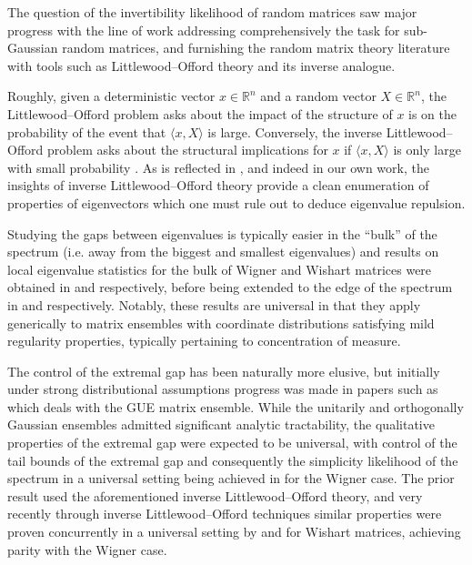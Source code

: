 \documentclass[11pt]{article}
\numberwithin{equation}{section}
\theoremstyle{remark}
\newcommand{\R}{\mathbb{R}}
\begin{document}
The question of the invertibility likelihood of random matrices saw major progress with the line of work \cite{rudelson2008littlewood, tao2009inverse, tao2009littlewood, rudelson2009smallest, vershynin2014invertibility} addressing comprehensively the task for sub-Gaussian random matrices, and furnishing the random matrix theory literature with tools such as Littlewood--Offord theory and its inverse analogue.

Roughly, given a deterministic vector $x \in \R^n$ and a random vector $X \in \R^n$, the Littlewood--Offord problem asks about the impact of the structure of $x$ is on the probability of the event that $\langle x, X \rangle$ is large. Conversely, the inverse Littlewood--Offord problem asks about the structural implications for $x$ if $\langle x, X \rangle$ is only large with small probability \cite{tao2009inverse}. As is reflected in \cite{nguyen2015randommatricestailbounds, han2025simplicity, christoffersen2025gaps}, and indeed in our own work, the insights of inverse Littlewood--Offord theory provide a clean enumeration of properties of eigenvectors which one must rule out to deduce eigenvalue repulsion.

Studying the gaps between eigenvalues is typically easier in the ``bulk'' of the spectrum (i.e. away from the biggest and smallest eigenvalues) and results on local eigenvalue statistics for the bulk of Wigner and Wishart matrices were obtained in \cite{tao2011random} and \cite{Tao_2012} respectively, before being extended to the edge of the spectrum in \cite{Tao_2010} and \cite{wang2012random} respectively. Notably, these results are universal in that they apply generically to matrix ensembles with coordinate distributions satisfying mild regularity properties, typically pertaining to concentration of measure.

The control of the extremal gap has been naturally more elusive, but initially under strong distributional assumptions progress was made in papers such as \cite{ben2013extreme} which deals with the GUE matrix ensemble. While the unitarily and orthogonally Gaussian ensembles admitted significant analytic tractability, the qualitative properties of the extremal gap were expected to be universal, with control of the tail bounds of the extremal gap and consequently the simplicity likelihood of the spectrum in a universal setting being achieved in \cite{nguyen2015randommatricestailbounds} for the Wigner case. The prior result used the aforementioned inverse Littlewood--Offord theory, and very recently through inverse Littlewood--Offord techniques similar properties were proven concurrently in a universal setting by \cite{christoffersen2025gaps} and \cite{han2025simplicity} for Wishart matrices, achieving parity with the Wigner case.
\end{document}

